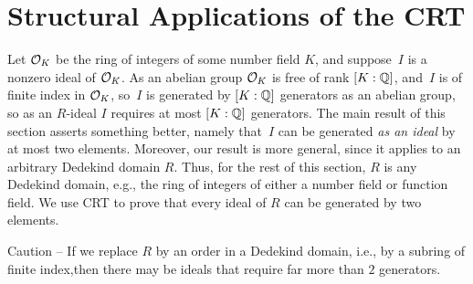 \section{Structural Applications of the CRT}
Let $\mathcal{O}_K$ be the ring of integers of some number field $K$, and
suppose~$I$ is a nonzero ideal of $\mathcal{O}_K$.  As an abelian group $\mathcal{O}_K$
is free of rank $[K:\mathbb{Q}]$, and~$I$ is of finite index in $\mathcal{O}_K$, so~$I$
is generated by $[K:\mathbb{Q}]$ generators as an abelian group, so as an
$R$-ideal $I$ requires at most $[K:\mathbb{Q}]$ generators.  The main result
of this section asserts something better, namely that~$I$ can be
generated {\em as an ideal} by at most two elements.  Moreover, our
result is more general, since it applies to an arbitrary Dedekind
domain $R$. Thus, for the rest of this section, $R$ is any Dedekind
domain, e.g., the ring of integers of either a number field or
function field.  We use CRT to prove that every ideal of $R$ can be
generated by two elements.  

\begin{remark}
Caution -- If we replace $R$ by an order in a Dedekind domain, i.e.,
by a subring of finite index,then there may be ideals that require far more than $2$ generators. 
\end{remark}

